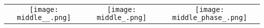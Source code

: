 \begin{tabular}{c @{\hskip 0pt} c @{\hskip 0pt} c }
    \texttt{[image: middle\_\_.png]}&
    \texttt{[image: middle\_.png]}&
    \texttt{[image: middle\_phase\_.png]}
\end{tabular}